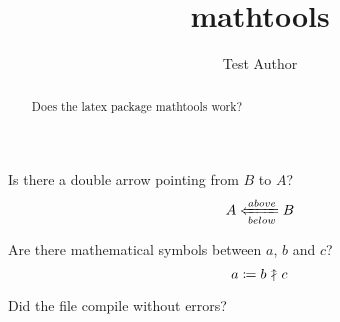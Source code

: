 \documentclass{snapshotmfo}
\author{Test Author}
\title{mathtools}
\begin{document}

\begin{abstract}
Does the latex package mathtools work?
\end{abstract}

Is there a double arrow pointing from $B$ to $A$?
\[ A \xLeftarrow[below]{above} B \]

Are there mathematical symbols between $a$, $b$ and $c$?
$$a \coloneqq b \nuparrow c$$

Did the file compile without errors?
\end{document}

